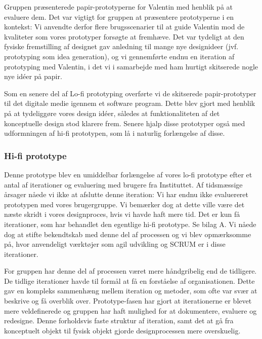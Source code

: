 Gruppen præsenterede papir-prototyperne for Valentin med henblik på at evaluere dem. Det var vigtigt for gruppen at præsentere prototyperne i en kontekst: Vi anvendte derfor flere brugsscenarier til at guide Valentin mod de kvaliteter som vores prototyper forsøgte at fremhæve. Det var tydeligt at den fysiske fremstilling af designet gav anledning til mange nye designideer (jvf. prototyping som idea generation), og vi gennemførte endnu en iteration af prototyping med Valentin, i det vi i samarbejde med ham hurtigt skitserede nogle nye idéer på papir.

Som en senere del af Lo-fi prototyping overførte vi de skitserede papir-prototyper til det digitale medie igennem et software program. Dette blev gjort med henblik på at tydeliggøre vores design idéer, således
at funktionaliteten af det konceptuelle design stod klarere frem. Senere hjalp disse prototyper også med udformningen af hi-fi prototypen, som lå i naturlig forlængelse af disse.

\subsubsection{Hi-fi prototype}
Denne prototype blev en umiddelbar forlængelse af vores lo-fi prototype efter et antal af iterationer og evaluering med brugere fra Instituttet. Af tidsmæssige årsager nåede vi ikke at afslutte
denne iteration: Vi har endnu ikke evaluereret prototypen med vores brugergruppe. Vi bemærker dog at dette ville være det næste skridt i vores designproces, hvis vi havde haft mere tid.
Det er kun få iterationer, som har behandlet den egentlige hi-fi prototype. Se bilag A. Vi nåede dog at stifte bekendtskab med denne del af processen og vi blev opmærksomme på, hvor anvendeligt værktøjer som agil udvikling og SCRUM er i disse iterationer.

For gruppen har denne del af processen været mere håndgribelig end de tidligere. De tidlige iterationer havde til formål at få en forståelse af organisationen. Dette gav en kompleks sammenhæng mellem iteration og metoder, som ofte var svær at beskrive og få overblik over. Prototype-fasen har gjort at iterationerne er blevet mere veldefinerede og gruppen har haft mulighed for at dokumentere, evaluere og redesigne. Denne forholdsvis faste struktur af iteration, samt det at gå fra konceptuelt objekt til fysisk objekt gjorde designprocessen mere overskuelig. 

